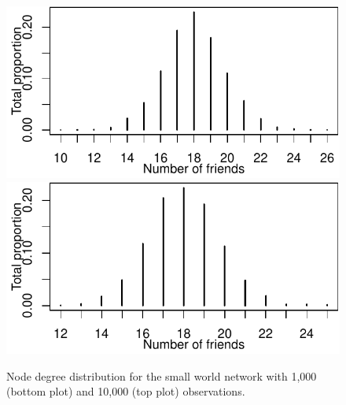 \documentclass[english]{article}\usepackage[]{graphicx}\usepackage[]{color}
\makeatletter
\def\maxwidth{ %
  \ifdim\Gin@nat@width>\linewidth
    \linewidth
  \else
    \Gin@nat@width
  \fi
}
\newenvironment{knitrout}{}{} %
\theoremstyle{plain}
\theoremstyle{plain}
\makeatother
\begin{document}
\begin{knitrout}\footnotesize
{}\color{fgcolor}\begin{figure}

{\centering \includegraphics[width=\maxwidth]{TablesFigs/knitR-unnamed-chunk-6-1} 
\includegraphics[width=\maxwidth]{TablesFigs/knitR-unnamed-chunk-6-2} 

}

\caption[Node degree distribution for the small world network with 1,000 (bottom plot) and 10,000 (top plot) observations]{Node degree distribution for the small world network with 1,000 (bottom plot) and 10,000 (top plot) observations.}\label{fig:unnamed-chunk-6}
\end{figure}


\end{knitrout}

\end{document}
